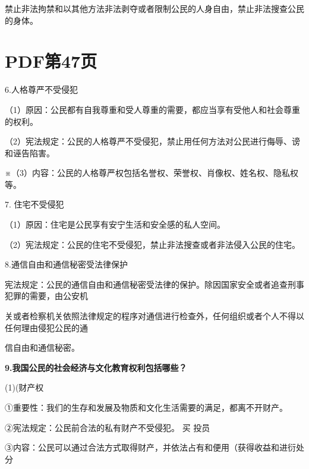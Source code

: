 \documentclass[lang=cn,11pt]{elegantbook}
\newcommand{\daofasym}[1]{{\daofasymbolfont #1}}
\newcommand{\daofasym}[1]{#1}
\begin{document}
禁止非法拘禁和以其他方法非法剥夺或者限制公民的人身自由，禁止非法搜查公民的身体。\par


\section*{PDF第47页}

6.人格尊严不受侵犯\par

（1）原因：公民都有自我尊重和受人尊重的需要，都应当享有受他人和社会尊重的权利。\par

（2）宪法规定：公民的人格尊严不受侵犯，禁止用任何方法对公民进行侮辱、谤和诬告陷害。\par

※（3）内容：公民的人格尊严权包括名誉权、荣誉权、肖像权、姓名权、隐私权等。\par

7. 住宅不受侵犯\par

（1）原因：住宅是公民享有安宁生活和安全感的私人空间。\par

（2）宪法规定：公民的住宅不受侵犯，禁止非法搜查或者非法侵入公民的住宅。\par

8.通信自由和通信秘密受法律保护\par

宪法规定：公民的通信自由和通信秘密受法律的保护。除因国家安全或者追查刑事犯罪的需要，由公安机\par

关或者检察机关依照法律规定的程序对通信进行检查外，任何组织或者个人不得以任何理由侵犯公民的通\par

信自由和通信秘密。\par

\textbf{9.我国公民的社会经济与文化教育权利包括哪些？}\par

(1)(财产权\par

\daofasym{①}重要性：我们的生存和发展及物质和文化生活需要的满足，都离不开财产。\par

\daofasym{②}宪法规定：公民前合法的私有财产不受侵犯。 买 投员\par

\daofasym{③}内容：公民可以通过合法方式取得财产，并依法占有和便用（获得收益和进衍处分\par
\end{document}

